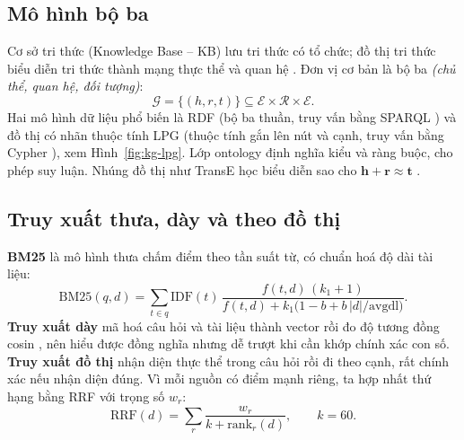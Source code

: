 \subsection{Mô hình bộ ba}
Cơ sở tri thức (Knowledge Base -- KB) lưu tri thức có tổ chức; đồ thị tri thức biểu diễn tri thức thành mạng thực thể và quan hệ \cite{ch5:singhal2012}. Đơn vị cơ bản là bộ ba \emph{(chủ thể, quan hệ, đối tượng)}:
\begin{equation}
  \mathcal{G}=\{(h,r,t)\}\subseteq\mathcal{E}\times\mathcal{R}\times\mathcal{E}.
\end{equation}
Hai mô hình dữ liệu phổ biến là RDF (bộ ba thuần, truy vấn bằng SPARQL \cite{ch5:sparql2013}) và đồ thị có nhãn thuộc tính LPG (thuộc tính gắn lên nút và cạnh, truy vấn bằng Cypher \cite{ch5:francis2018}), xem Hình~\ref{fig:kg-lpg}. Lớp ontology định nghĩa kiểu và ràng buộc, cho phép suy luận. Nhúng đồ thị như TransE học biểu diễn sao cho $\mathbf{h}+\mathbf{r}\approx\mathbf{t}$ \cite{ch5:bordes2013}.


\subsection{Truy xuất thưa, dày và theo đồ thị}
\textbf{BM25} \cite{ch5:robertson2009} là mô hình thưa chấm điểm theo tần suất từ, có chuẩn hoá độ dài tài liệu:
\begin{equation}
  \mathrm{BM25}(q,d)=\sum_{t\in q}\mathrm{IDF}(t)\,\frac{f(t,d)\,(k_1+1)}{f(t,d)+k_1\big(1-b+b\,|d|/\mathrm{avgdl}\big)}.
\end{equation}
\textbf{Truy xuất dày} mã hoá câu hỏi và tài liệu thành vector rồi đo độ tương đồng cosin \cite{ch5:karpukhin2020}, nên hiểu được đồng nghĩa nhưng dễ trượt khi cần khớp chính xác con số. \textbf{Truy xuất đồ thị} nhận diện thực thể trong câu hỏi rồi đi theo cạnh, rất chính xác nếu nhận diện đúng. Vì mỗi nguồn có điểm mạnh riêng, ta hợp nhất thứ hạng bằng RRF \cite{ch5:cormack2009} với trọng số $w_r$:
\begin{equation}
  \mathrm{RRF}(d)=\sum_{r}\frac{w_r}{k+\mathrm{rank}_r(d)},\qquad k=60.
\end{equation}


